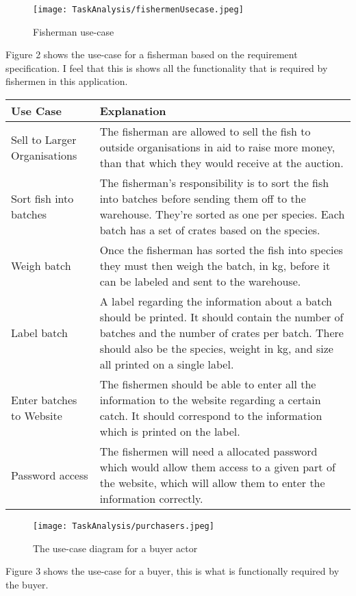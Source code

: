 \documentclass{article}
\begin{document}
\begin{figure}[htp]
\centering
\texttt{[image: TaskAnalysis/fishermenUsecase.jpeg]}
\caption{Fisherman use-case}
\label{}
\end{figure}
Figure 2 shows the use-case for a fisherman based on the requirement specification. I feel that this is shows all the functionality that is required by fishermen in this application. 
\begin{center}
\begin{tabular}{p{6cm}|p{6cm}}
	\hline
	\hline Use Case & Explanation\\ \hline
	Sell to Larger Organisations & The fisherman are allowed to sell the fish to outside organisations in aid to raise more money, than that which they would receive at the auction.\\
	\hline
	Sort fish into batches & The fisherman's responsibility is to sort the fish into batches before sending them off to the warehouse. They're sorted as one per species. Each batch has a set of crates based on the species. \\
	\hline
	Weigh batch & Once the fisherman has sorted the fish into species they must then weigh the batch, in kg, before it can be labeled and sent to the warehouse.\\
	\hline
	Label batch & A label regarding the information about a batch should be printed. It should contain the number of batches and the number of crates per batch. There should also be the species, weight in kg, and size all printed on a single label. \\
	\hline
	Enter batches to Website & The fishermen should be able to enter all the information to the website regarding a certain catch. It should correspond to the information which is printed on the label. \\
	\hline
	Password access & The fishermen will need a allocated password which would allow them access to a given part of the website, which will allow them to enter the information correctly.\\
	\hline 
	\hline
\end{tabular}
\end{center} 
\begin{figure}[htp]
\centering
\texttt{[image: TaskAnalysis/purchasers.jpeg]}
\caption{The use-case diagram for a buyer actor}
\label{}
\end{figure}
Figure 3 shows the use-case for a buyer, this is what is functionally required by the buyer. 
\end{document}
